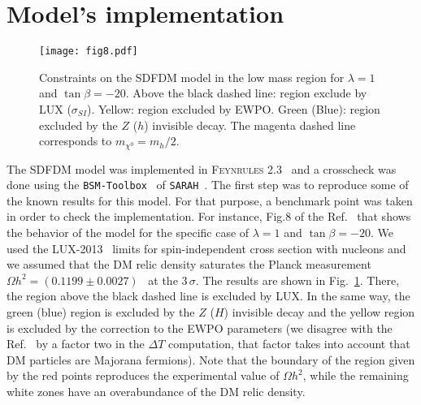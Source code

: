 \section{Model's implementation}
%
\begin{figure}[h]
\begin{center}
\texttt{[image: fig8.pdf]}
\end{center}
\caption{Constraints on the SDFDM model in the low mass region for $\lambda=1$ and $\tan\beta=-20$. Above the black dashed line: region exclude by LUX ($\sigma_{SI}$). Yellow: region excluded by EWPO. Green (Blue): region excluded by the $Z$ ($h$) invisible decay. The magenta dashed line corresponds to $m_{\chi^0}=m_h/2 $.}
\label{fig:fig8-1505.03867}
\end{figure}

The SDFDM model was implemented in \textsc{Feynrules 2.3}~\cite{Christensen:2008py} and a crosscheck was done using the \texttt{BSM-Toolbox}~\cite{Staub:2011dp} of \texttt{SARAH}~\cite{Staub:2008uz,Staub:2013tta}.
%
The first step was to reproduce some of the known results for this model. 
For that purpose, a benchmark point was taken in order to check the implementation.
For instance, Fig.8 of the Ref.~\cite{Calibbi:2015nha} that shows the behavior of the model for the specific case of $\lambda=1$ and $\tan\beta=-20$.
% 
We used the LUX-2013~\cite{Akerib:2013tjd}  limits for spin-independent cross section with nucleons
and we assumed that the DM  relic density saturates the Planck measurement $\Omega h^2=(0.1199 \pm 0.0027)$~\cite{Ade:2013zuv} at the $3\,\sigma$. 
The results are shown in Fig.~\ref{fig:fig8-1505.03867}.
There, the region above the black dashed line is excluded by LUX. In the same way, the green (blue) region is excluded by the $Z$ ($H$) invisible decay and the yellow region  is excluded by the correction to the EWPO parameters (we disagree with the Ref.~\cite{Calibbi:2015nha} by a factor two in the $\Delta T$ computation,
that factor takes into account that DM particles are Majorana fermions).
Note that the boundary of the region given by the red points reproduces the experimental value of  $\Omega h^2$, while the remaining white zones have an overabundance of the DM relic density.



 






